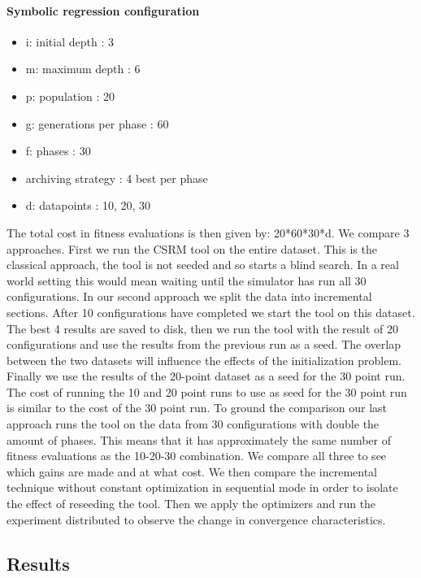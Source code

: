 \paragraph{Symbolic regression configuration}
\begin{itemize}
\item i: initial depth : 3
\item m: maximum depth : 6
\item p: population : 20
\item g: generations per phase : 60
\item f: phases : 30
\item archiving strategy : 4 best per phase
\item d: datapoints : 10, 20, 30
\end{itemize}
The total cost in fitness evaluations is then given by: 20*60*30*d.
We compare 3 approaches. First we run the CSRM tool on the entire dataset. This is the classical approach, the tool is not seeded and so starts a blind search. In a real world setting this would mean waiting until the simulator has run all 30 configurations.
In our second approach we split the data into incremental sections. After 10 configurations have completed we start the tool on this dataset. 
The best 4 results are saved to disk, then we run the tool with the result of 20 configurations and use the results from the previous run as a seed. The overlap between the two datasets will influence the effects of the initialization problem. Finally we use the results of the 20-point dataset as a seed for the 30 point run. 
The cost of running the 10 and 20 point runs to use as seed for the 30 point run is similar to the cost of the 30 point run. 
To ground the comparison our last approach runs the tool on the data from 30 configurations with double the amount of phases. This means that it has approximately the same number of fitness evaluations as the 10-20-30 combination. We compare all three to see which gains are made and at what cost.
We then compare the incremental technique without constant optimization in sequential mode in order to isolate the effect of reseeding the tool.
Then we apply the optimizers and run the experiment distributed to observe the change in convergence characteristics.
\subsection{Results}
